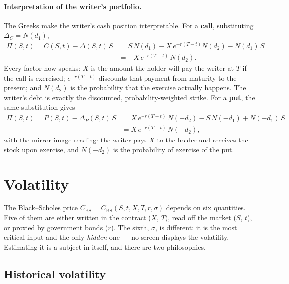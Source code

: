 \paragraph*{Interpretation of the writer's portfolio.}

The Greeks make the writer's cash position interpretable.
For a \textbf{call}, substituting $\Delta_C = N(d_1)$,
\begin{equation}\begin{split}
\Pi(S,t) = C(S,t) - \Delta(S,t)\, S &= S\, N(d_1) - X\, e^{-r(T-t)} N(d_2) - N(d_1)\, S\\
&= -X\, e^{-r(T-t)}\, N(d_2).
\end{split}\end{equation}
Every factor now speaks: $X$ is the amount the holder will pay the writer at $T$ if the call is exercised; $e^{-r(T-t)}$ discounts that payment from maturity to the present; and $N(d_2)$ is the probability that the exercise actually happens.
The writer's debt is exactly the discounted, probability-weighted strike.
For a \textbf{put}, the same substitution gives
\begin{equation}\begin{split}
\Pi(S,t) = P(S,t) - \Delta_P(S,t)\, S &= X\, e^{-r(T-t)}\, N(-d_2) - S\,N(-d_1) + N(-d_1)\,S\\
&= X\, e^{-r(T-t)}\, N(-d_2),
\end{split}\end{equation}
with the mirror-image reading: the writer pays $X$ to the holder and receives the stock upon exercise, and $N(-d_2)$ is the probability of exercise of the put.


\section{Volatility}\label{sec:volatility}

The Black--Scholes price $C_{\text{BS}} = C_{\text{BS}}(S, t, X, T, r, \sigma)$ depends on six quantities.
Five of them are either written in the contract ($X$, $T$), read off the market ($S$, $t$), or proxied by government bonds ($r$).
The sixth, $\sigma$, is different: it is the most critical input and the only \emph{hidden} one --- no screen displays the volatility.
Estimating it is a subject in itself, and there are two philosophies.

\subsection{Historical volatility}

